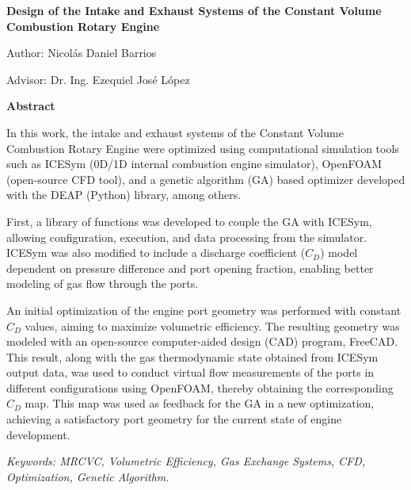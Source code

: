 \begin{center} \large{\textbf{{Design of the Intake and Exhaust Systems of the
Constant Volume Combustion Rotary Engine}}}\
\end{center} %

\normalsize \hfill Author: Nicolás Daniel Barrios

\hfill Advisor: Dr. Ing. Ezequiel José López

\textbf{Abstract}

In this work, the intake and exhaust systems of the Constant Volume Combustion
Rotary Engine were optimized using computational simulation tools such
as ICESym (0D/1D internal combustion engine simulator), OpenFOAM (open-source
CFD tool), and a genetic algorithm (GA) based optimizer developed with the DEAP
(Python) library, among others.

First, a library of functions was developed to couple the GA with ICESym,
allowing configuration, execution, and data processing from the simulator.
%
ICESym was also modified to include a discharge coefficient ($C_{D}$) model
dependent on pressure difference and port opening fraction, enabling better
modeling of gas flow through the ports.

An initial optimization of the engine port geometry was performed with constant
$C_{D}$ values, aiming to maximize volumetric efficiency.
%
The resulting geometry was modeled with an open-source computer-aided design
(CAD) program, FreeCAD.
%
This result, along with the gas thermodynamic state obtained from ICESym output
data, was used to conduct virtual flow measurements of the ports in different
configurations using OpenFOAM, thereby obtaining the corresponding $C_{D}$ map.
%
This map was used as feedback for the GA in a new optimization, achieving a
satisfactory port geometry for the current state of engine development.

\noindent

\textit{Keywords: MRCVC, Volumetric Efficiency, Gas Exchange Systems, CFD,
Optimization, Genetic Algorithm.}


\newpage
